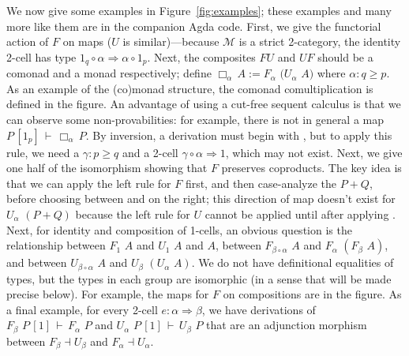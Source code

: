 \documentclass{drl-common/llncs}
\newcommand{\M}{\ensuremath{\mathcal{M}}}
\newcommand{\la}{\ensuremath{\dashv}}
\newcommand{\tc}[2]{\ensuremath{#1 \Rightarrow #2}}
\newcommand\compo[2]{\ensuremath{#1 \circ #2}}
\newcommand\F[2]{\ensuremath{F_{#1} \,\, #2}}
\newcommand\U[2]{\ensuremath{U_{#1} \,\, #2}}
\newcommand\coprd[2]{\ensuremath{#1 + #2}}
\newcommand\seq[3]{\ensuremath{#1 \, [ #2 ] \, \vdash \, #3}}
\renewcommand\irl[1]{\dsd{#1}}
\newcommand\Bx[2]{\ensuremath{\Box_{#1} \, {#2}}}
\begin{document}
We now give some examples in Figure~\ref{fig:examples}; these examples
and many more like them are in the companion Agda code.  First, we give
the functorial action of $F$ on maps ($U$ is similar)---because \M\/ is
a strict 2-category, the identity 2-cell has type \tc{\compo{1_q}
  \alpha}{\compo {\alpha} {1_p}}.  Next, the composites $FU$ and $UF$
should be a comonad and a monad respectively; define $\Bx \alpha A := \F
\alpha (\U \alpha A)$ where $\alpha : q \ge p$.  As an example of the
(co)monad structure, the comonad comultiplication is defined in the
figure.  An advantage of using a cut-free sequent calculus is that we
can observe some non-provabilities: for example, there is not in general
a map \seq{P}{1_p}{\Bx{\alpha}{P}}. By inversion, a derivation must
begin with \irl{FR}, but to apply this rule, we need a $\gamma : p \ge
q$ and a 2-cell $\tc{\compo{\gamma}{\alpha}}{1}$, which may not exist.
Next, we give one half of the isomorphism showing that $F$ preserves
coproducts.  The key idea is that we can apply the left rule for $F$
first, and then case-analyze the $\coprd{P}{Q}$, before choosing between
\irl{Inl} and \irl{Inr} on the right; this direction of map doesn't
exist for \U{\alpha}{(\coprd{P}{Q})} because the left rule for $U$
cannot be applied until after applying \irl{UR}.  Next, for identity and
composition of 1-cells, an obvious question is the relationship between
$\F 1 A$ and $\U 1 A$ and $A$, between $\F {\compo{\beta}{\alpha}} A$
and $\F \alpha {(\F \beta A)}$, and between $\U {\compo{\beta}{\alpha}}
A$ and $\U \beta {(\U \alpha A)}$.  We do not have definitional
equalities of types, but the types in each group are isomorphic (in a
sense that will be made precise below).  For example, the maps for $F$
on compositions are in the figure.  As a final example, for every 2-cell
$e : \tc \alpha \beta$, we have derivations of \seq{\F \beta P}{1}{\F
  \alpha P} and \seq{\U \alpha P}{1}{\U \beta P} that are an adjunction
morphism between $F_\beta \la U_\beta$ and $F_\alpha \la U_\alpha$.  
\end{document}
